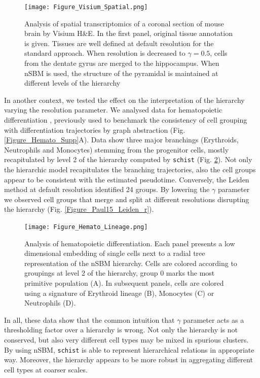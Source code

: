 \documentclass[10pt]{article}
\begin{document}
\begin{figure}[H]
\centering
\texttt{[image: Figure\_Visium\_Spatial.png]}
\caption[]{Analysis of spatial transcriptomics of a coronal section of mouse brain by Visium H\&E. In the first panel, original tissue annotation is given. Tissues are well defined at default resolution for the standard approach. When resolution is decreased to $\gamma = 0.5$, cells from the dentate gyrus are merged to the hippocampus. When nSBM is used, the structure of the pyramidal is maintained at different levels of the hierarchy}\label{Figure_Visium}
\end{figure}

In another context, we tested the effect on the interpretation of the hierarchy varying the resolution parameter. We analysed data for hematopoietic differentiation \cite{paul_2015}, previously used to benchmark the consistency of cell grouping with differentiation trajectories by graph abstraction \cite{wolf_2019} (Fig. \ref{Figure_Hemato_Supp}A). Data show three major branchings (Erythroids, Neutrophils and Monocytes) stemming from the progenitor cells, mostly recapitulated by level 2 of the hierarchy computed by \texttt{schist} (Fig. \ref{Figure_Hemato_Lineage}). Not only the hierarchic model recapitulates the branching trajectories, also the cell groups appear to be consistent with the estimated pseudotime. Conversely, the Leiden method at default resolution identified 24 groups. By lowering the $\gamma$ parameter we observed cell groups that merge and split at different resolutions disrupting the hierarchy (Fig. \ref{Figure_Paul15_Leiden_r}). 


\begin{figure}[H]
\centering
\texttt{[image: Figure\_Hemato\_Lineage.png]}
\caption[]{Analysis of hematopoietic differentiation. Each panel presents a low dimensional embedding of single cells next to a radial tree representation of the nSBM hierarchy. Cells are colored according to groupings at level 2 of the hierarchy, group 0 marks the most primitive population (A). In subsequent panels, cells are colored using a signature of Erythroid lineage (B), Monocytes (C) or Neutrophils (D).}\label{Figure_Hemato_Lineage}
\end{figure}

In all, these data show that the common intuition that $\gamma$ parameter acts as a thresholding factor over a hierarchy is wrong. Not only the hierarchy is not conserved, but also very different cell types may be mixed in spurious clusters. By using nSBM, \texttt{schist} is able to represent hierarchical relations in appropriate way. Moreover, the hierarchy appears to be more robust in aggregating different cell types at coarser scales.
\end{document}
